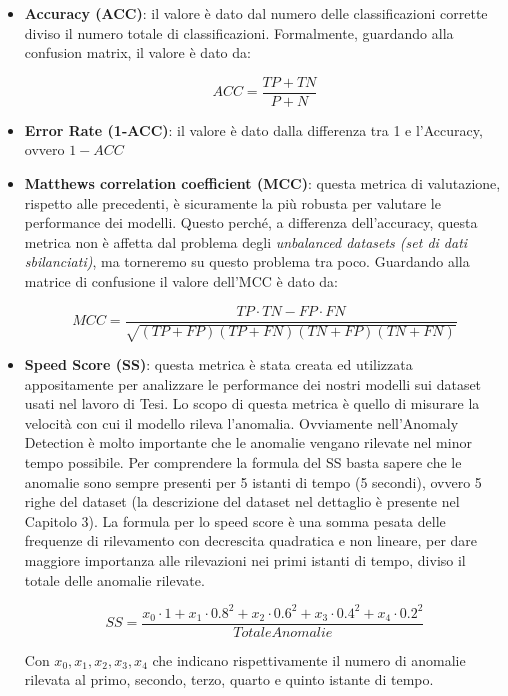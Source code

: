 \begin{itemize}

  \item \textbf{Accuracy (ACC)}: il valore \`e dato dal numero delle classificazioni corrette diviso il numero totale di classificazioni. Formalmente, guardando alla confusion matrix, il valore \`e dato da:

  \begin{equation}
    ACC = \frac{TP + TN}{P + N}
  \end{equation}
  
  \item \textbf{Error Rate (1-ACC)}: il valore \`e dato dalla differenza tra 1 e l'Accuracy, ovvero $1-ACC$
  
  \item \textbf{Matthews correlation coefficient (MCC)}: questa metrica di valutazione, rispetto alle precedenti, \`e sicuramente la pi\`u robusta per valutare le performance dei modelli. Questo perch\'e, a differenza dell'accuracy, questa metrica non \`e affetta dal problema degli \textit{unbalanced datasets (set di dati sbilanciati)}, ma torneremo su questo problema tra poco. Guardando alla matrice di confusione il valore dell'MCC \`e dato da:
  
  \begin{equation}
      MCC = \frac{TP \cdot TN - FP \cdot FN}{\sqrt{(TP + FP)(TP + FN)(TN + FP)(TN + FN)}}
  \end{equation}

  
  \item \textbf{Speed Score (SS)}: questa metrica \`e stata creata ed utilizzata appositamente per analizzare le performance dei nostri modelli sui dataset usati nel lavoro di Tesi. Lo scopo di questa metrica \`e quello di misurare la velocit\`a con cui il modello rileva l'anomalia. Ovviamente nell'Anomaly Detection \`e molto importante che le anomalie vengano rilevate nel minor tempo possibile. Per comprendere la formula del SS basta sapere che le anomalie sono sempre presenti per 5 istanti di tempo (5 secondi), ovvero 5 righe del dataset (la descrizione del dataset nel dettaglio \`e presente nel Capitolo 3). La formula per lo speed score \`e una somma pesata delle frequenze di rilevamento con decrescita quadratica e non lineare, per dare maggiore importanza alle rilevazioni nei primi istanti di tempo, diviso il totale delle anomalie rilevate.
  
    \begin{equation}
      SS = \frac{x_0 \cdot 1 + x_1 \cdot 0.8^2 + x_2 \cdot 0.6^2 + x_3 \cdot 0.4^2 + x_4 \cdot 0.2^2}{TotaleAnomalie}
    \end{equation}

    Con $x_0, x_1, x_2, x_3, x_4$ che indicano rispettivamente il numero di anomalie rilevata al primo, secondo, terzo, quarto e quinto istante di tempo.
\end{itemize}

